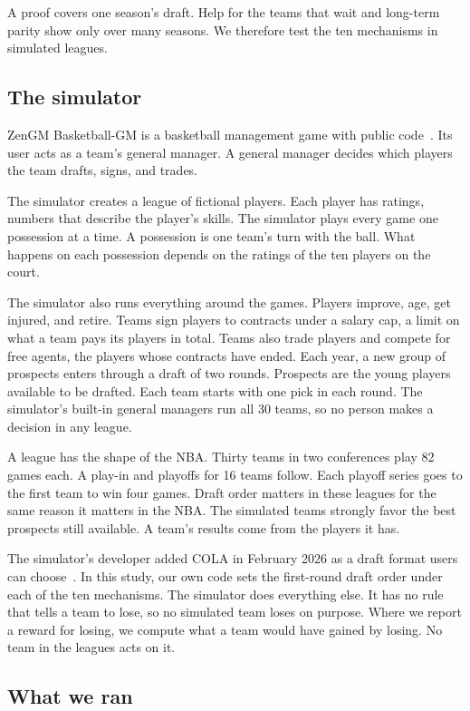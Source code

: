 \documentclass[11pt,letterpaper]{article}
\begin{document}
A proof covers one season's draft. Help for the teams that wait and long-term parity show only over many seasons. We therefore test the ten mechanisms in simulated leagues.

\subsection{The simulator}

ZenGM Basketball-GM is a basketball management game with public code~\cite{zengm}. Its user acts as a team's general manager. A general manager decides which players the team drafts, signs, and trades.

The simulator creates a league of fictional players. Each player has ratings, numbers that describe the player's skills. The simulator plays every game one possession at a time. A possession is one team's turn with the ball. What happens on each possession depends on the ratings of the ten players on the court.

The simulator also runs everything around the games. Players improve, age, get injured, and retire. Teams sign players to contracts under a salary cap, a limit on what a team pays its players in total. Teams also trade players and compete for free agents, the players whose contracts have ended. Each year, a new group of prospects enters through a draft of two rounds. Prospects are the young players available to be drafted. Each team starts with one pick in each round. The simulator's built-in general managers run all 30 teams, so no person makes a decision in any league.

A league has the shape of the NBA. Thirty teams in two conferences play 82 games each. A play-in and playoffs for 16 teams follow. Each playoff series goes to the first team to win four games. Draft order matters in these leagues for the same reason it matters in the NBA. The simulated teams strongly favor the best prospects still available. A team's results come from the players it has.

The simulator's developer added COLA in February 2026 as a draft format users can choose~\cite{zengm2026cola}. In this study, our own code sets the first-round draft order under each of the ten mechanisms. The simulator does everything else. It has no rule that tells a team to lose, so no simulated team loses on purpose. Where we report a reward for losing, we compute what a team would have gained by losing. No team in the leagues acts on it.

\subsection{What we ran}
\end{document}
